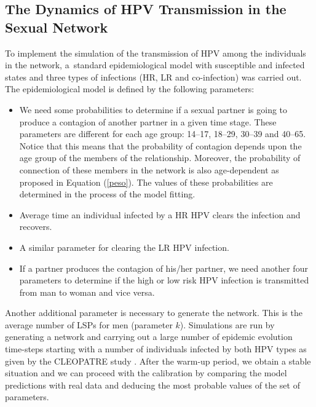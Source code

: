\subsection{The Dynamics of HPV Transmission in the Sexual Network}

To implement the simulation of the transmission of HPV among the individuals in the network, a~standard epidemiological model with susceptible and infected states and three types of infections (HR, LR and co-infection) was carried out.
The epidemiological model is defined by the following parameters:

\begin{itemize}[leftmargin=*,labelsep=5mm]
\item We need some probabilities to determine if a sexual partner is going to produce a contagion of another partner in a given time stage. These parameters are different for each age group:	
 14--17, 18--29, 30--39 and 40--65. Notice that this means that the probability of contagion depends upon the age group of the members of the relationship. Moreover, the probability of connection of these members in the network is also age-dependent
as proposed in Equation (\ref{peso}). The values of these probabilities are determined in the process of the model fitting.
\item Average time an individual infected by a HR HPV clears the infection and recovers.
\item A similar parameter for clearing the LR HPV infection.
\item If a partner produces the contagion of his/her partner, we need another four parameters to determine if the high or low risk HPV infection is transmitted from man to woman and vice versa. 
\end{itemize}

Another additional parameter is necessary to generate the network. This is the average number of LSPs for men (parameter $k$). Simulations are run by generating a network and carrying out a large number of epidemic evolution time-steps starting with a number of individuals infected by both HPV types as given by the CLEOPATRE study \cite{castellsague2012prevalence}.
After the warm-up period, we obtain a stable situation and we can proceed with the calibration by comparing the model predictions with real data and deducing the most probable values of the set of parameters.

